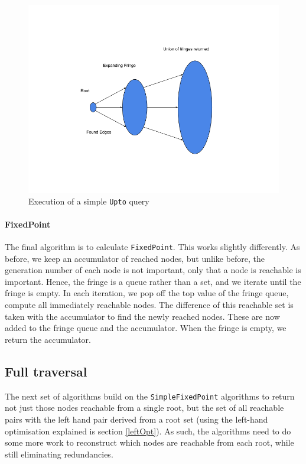 \documentclass[12pt,a4paper,twoside,openright]{report}
\newcommand\codeName[1]{\texttt{#1}}
\let\oldparagraph\paragraph
\renewcommand{\paragraph}[1]{\oldparagraph{#1}\mbox{}}
\begin{document}
\begin{figure}[ht]
\centering
  \includegraphics[width=\textwidth]{figs/Upto.png}
  \caption{Execution of a simple \codeName{Upto} query}
  \label{fig:UptoSingle}
\end{figure}
	
		\paragraph{FixedPoint}
The  final algorithm is to calculate \codeName{FixedPoint}. This works slightly differently. As before, we keep an accumulator of reached nodes, but unlike before, the generation number of each node is not important, only that a node is reachable is important. Hence, the fringe is a queue rather than a set, and we iterate until the fringe is empty. In each iteration, we pop off the top value of the fringe queue, compute all immediately reachable nodes. The difference of this reachable set is taken with the accumulator to find the newly reached nodes. These are now added to the fringe queue and the accumulator. When the fringe is empty, we return the accumulator.
	
	\subsection{Full traversal}
		The next set of algorithms build on the \codeName{SimpleFixedPoint} algorithms to return not just those nodes reachable from a single root, but the set of all reachable pairs with the left hand pair derived from a root set (using the left-hand optimisation explained is section \ref{leftOpt}). As such, the algorithms need to do some more work to reconstruct which nodes are reachable from each root, while still eliminating redundancies.
\end{document}
